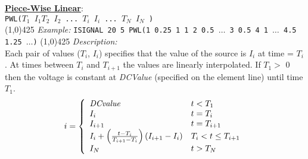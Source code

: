 \underline{\bf{ Piece-Wise Linear}}:\\
\texttt{PWL($T_1$ $I_1$\B $T_2$ $I_2$ ... $T_i$ $I_i$ ... $T_N$ $I_N$ \E )}\\
\newline
\linethickness{0.5mm} \line(1,0){425}
\newline
\textit{Example:}
\newline
\texttt{ISIGNAL\ 20\ 5\ PWL(1 0.25  1 1 2 0.5 $\ldots$ 3 0.5 4 1
$\ldots$ 4.5 1.25 $\ldots$)}
\newline
\linethickness{0.5mm} \line(1,0){425}
\newline
\textit{Description:}\\
Each pair of values ($T_i$, $I_i$) specifies that  the  value of
the  source  is $I_i$ at time = $T_i$. At times between $T_i$ and
$T_{i+1}$ the values are linearly interpolated. If $T_1 >$ 0 then
the voltage is constant at {\it DCValue} (specified on the element
line) until time $T_1$.
\begin{equation}
i = \left\{ \begin{array}{ll}
    {\it DCvalue}& t < T_1\\
    I_i         & t = T_i\\
    I_{i+1}     & t = T_{i+1}\\
    I_i + \left({{t-T_i} \over {T_{i+1} - T_i}}\right)(I_{i+1}-I_i)
                & T_i < t \le T_{i+1}\\
    I_N         & t > T_N\\
     \end{array} \right. %
\end{equation}
